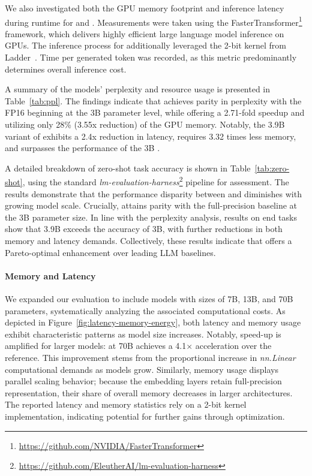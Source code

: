 We also investigated both the GPU memory footprint and inference latency during runtime for  and . Measurements were taken using the FasterTransformer\footnote{\url{https://github.com/NVIDIA/FasterTransformer}} framework, which delivers highly efficient large language model inference on GPUs. The inference process for  additionally leveraged the 2-bit kernel from Ladder~\cite{ladder}. Time per generated token was recorded, as this metric predominantly determines overall inference cost.

A summary of the models’ perplexity and resource usage is presented in Table~\ref{tab:ppl}. The findings indicate that  achieves parity in perplexity with the FP16  beginning at the 3B parameter level, while offering a 2.71-fold speedup and utilizing only 28\% (3.55x reduction) of the GPU memory. Notably, the 3.9B variant of  exhibits a 2.4x reduction in latency, requires 3.32 times less memory, and surpasses the performance of the 3B .

A detailed breakdown of zero-shot task accuracy is shown in Table~\ref{tab:zero-shot}, using the standard \emph{lm-evaluation-harness}\footnote{\url{https://github.com/EleutherAI/lm-evaluation-harness}} pipeline for assessment. The results demonstrate that the performance disparity between  and  diminishes with growing model scale. Crucially,  attains parity with the full-precision baseline at the 3B parameter size. In line with the perplexity analysis, results on end tasks show that  3.9B exceeds the accuracy of  3B, with further reductions in both memory and latency demands. Collectively, these results indicate that  offers a Pareto-optimal enhancement over leading LLM baselines.

\paragraph{Memory and Latency}

We expanded our evaluation to include models with sizes of 7B, 13B, and 70B parameters, systematically analyzing the associated computational costs. As depicted in Figure~\ref{fig:latency-memory-energy}, both latency and memory usage exhibit characteristic patterns as model size increases. Notably, speed-up is amplified for larger models:  at 70B achieves a 4.1$\times$ acceleration over the  reference. This improvement stems from the proportional increase in \emph{nn.Linear} computational demands as models grow. Similarly, memory usage displays parallel scaling behavior; because the embedding layers retain full-precision representation, their share of overall memory decreases in larger architectures. The reported latency and memory statistics rely on a 2-bit kernel implementation, indicating potential for further gains through optimization.

